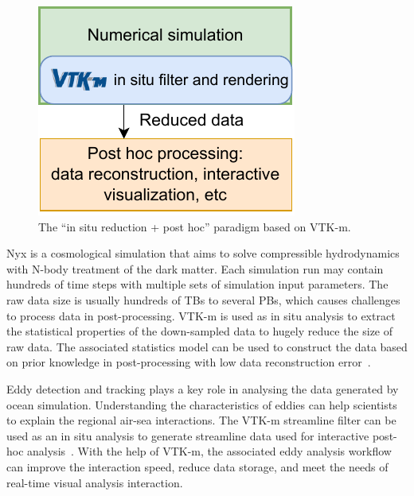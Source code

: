 \begin{figure}[htb]
  \centering
\includegraphics[width=0.60\linewidth]{figures/vtkm_insitu_posthoc}
\caption{The ``in situ reduction + post hoc'' paradigm based on VTK-m.}
\label{fig:vtkm_insitu_posthoc}
\end{figure}


Nyx is a cosmological simulation that aims to solve compressible hydrodynamics with N-body treatment of the dark matter. Each simulation run may contain hundreds of time steps with multiple sets of simulation input parameters. The raw data size is usually hundreds of TBs to several PBs, which causes challenges to process data in post-processing. 
VTK-m is used as in situ analysis to extract the statistical properties of the down-sampled data to hugely reduce the size of raw data. The associated statistics model can be used to construct the data based on prior knowledge in post-processing with low data reconstruction error~\cite{Wang2019}.

Eddy detection and tracking plays a key role in analysing the data generated by ocean simulation. Understanding the characteristics of eddies can help scientists to explain the regional air-sea interactions.
The VTK-m streamline filter can be used as an in situ analysis to generate streamline data used for interactive post-hoc analysis~\cite{Han2022}. With the help of VTK-m, the associated eddy analysis workflow can improve the interaction speed, reduce data storage, and meet the
needs of real-time visual analysis interaction.  

